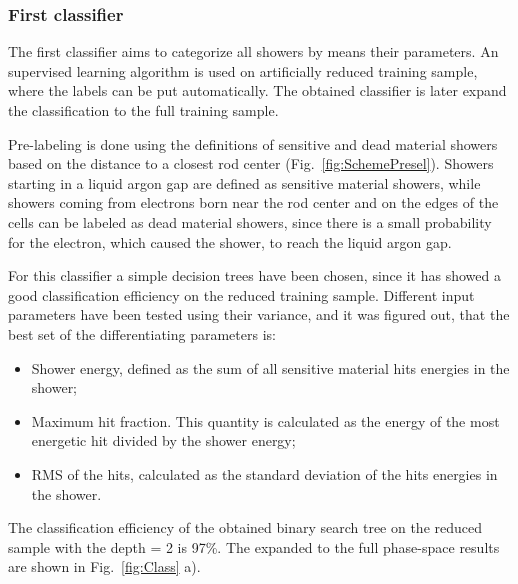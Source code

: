\begin{figure}[!tbp]
\end{figure}

\subsubsection{First classifier}

The first classifier aims to categorize all showers by means their parameters. An supervised learning algorithm is used on artificially reduced training sample, where the labels can be put automatically. The obtained classifier is later expand the classification to the full training sample. 

Pre-labeling is done using the definitions of sensitive and dead material showers based on the distance to a closest rod center (Fig.~\ref{fig:SchemePresel}). Showers starting in a liquid argon gap are defined as sensitive material showers, while showers coming from electrons born near the rod center and on the edges of the cells can be labeled as dead material showers, since there is a small probability for the electron, which caused the shower, to reach the liquid argon gap.

For this classifier a simple decision trees have been chosen, since it has showed a good classification efficiency on the reduced training sample. Different input parameters have been tested using their variance, and it was figured out, that the best set of the differentiating parameters is:

\begin{itemize}
\item Shower energy, defined as the sum of all sensitive material hits energies in the shower;
\item Maximum hit fraction. This quantity is calculated as the energy of the most energetic hit divided by the shower energy;
\item RMS of the hits, calculated as the standard deviation of the hits energies in the shower.
\end{itemize}

The classification efficiency of the obtained binary search tree on the reduced sample with the depth = 2 is 97\%. The expanded to the full phase-space results are shown in Fig.~\ref{fig:Class} a). 

